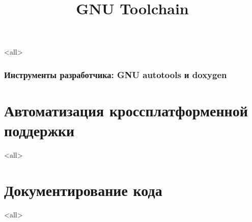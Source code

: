 
\title[toolchain]{GNU Toolchain}

\mode<all>{}




\begin{frame}
	\frametitle{Инструменты разработчика: GNU autotools и doxygen}
	\titlepage
	\vspace{-0.5cm}
	\begin{center}
	\end{center}
\end{frame}

\begin{frame}
	\tableofcontents
\end{frame}



\section{Автоматизация кроссплатформенной поддержки}

\mode<all>{}

\section{Документирование кода}

\mode<all>{}




